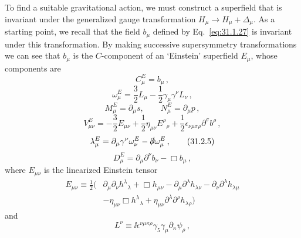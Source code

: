 To find a suitable gravitational action, we must construct a superfield that
is invariant under the generalized gauge transformation
\(H_\mu\to H_\mu+\Delta_\mu\). As a starting point, we recall that the field
\(b_\mu\) defined by Eq.~\eqref{eq:31.1.27} is invariant under this
transformation. By making successive supersymmetry transformations we can see
that \(b_\mu\) is the \(C\)-component of an `Einstein' superfield \(E_\mu\),
whose components are
\begin{equation}
  C_\mu^E=b_\mu\,,
  \tag{31.2.1}\label{eq:31.2.1}
\end{equation}
\begin{equation}
  \omega_\mu^E
  =\frac32L_\mu-\frac12\gamma_\mu\gamma^\nu L_\nu\,,
  \tag{31.2.2}\label{eq:31.2.2}
\end{equation}
\begin{equation}
  M_\mu^E=\partial_\mu s,\qquad
  N_\mu^E=\partial_\mu p\,,
  \tag{31.2.3}\label{eq:31.2.3}
\end{equation}
\begin{equation}
  V_{\mu\nu}^E
  =-\frac32E_{\mu\nu}
   +\frac12\eta_{\mu\nu}E^\rho{}_\rho
   +\frac12\epsilon_{\nu\mu\sigma\rho}\partial^\sigma b^\rho\,,
  \tag{31.2.4}\label{eq:31.2.4}
\end{equation}
\begin{equation}
  \lambda_\mu^E
  =\partial_\mu\gamma^\nu\omega_\nu^E-\sl{\partial}\omega_\mu^E\,,
  \tag{31.2.5}\label{eq:31.2.5}
\end{equation}
\begin{equation}
  D_\mu^E=\partial_\mu\partial^\nu b_\nu-\Box b_\mu\,,
  \tag{31.2.6}\label{eq:31.2.6}
\end{equation}
where \(E_{\mu\nu}\) is the linearized Einstein tensor
\begin{equation}
  \begin{aligned}
  E_{\mu\nu}\equiv\frac12\bigl(
    &\partial_\mu\partial_\nu h^\lambda{}_\lambda
     +\Box h_{\mu\nu}
     -\partial_\mu\partial^\lambda h_{\lambda\nu}
     -\partial_\nu\partial^\lambda h_{\lambda\mu}
  \\
    &-\eta_{\mu\nu}\Box h^\lambda{}_\lambda
     +\eta_{\mu\nu}\partial^\lambda\partial^\rho h_{\lambda\rho}
  \bigr)
  \end{aligned}
  \tag{31.2.7}\label{eq:31.2.7}
\end{equation}
and
\begin{equation}
  L^\nu\equiv
  \ii\epsilon^{\nu\mu\kappa\rho}\gamma_5\gamma_\mu
  \partial_\kappa\psi_\rho\,,
  \tag{31.2.8}\label{eq:31.2.8}
\end{equation}
